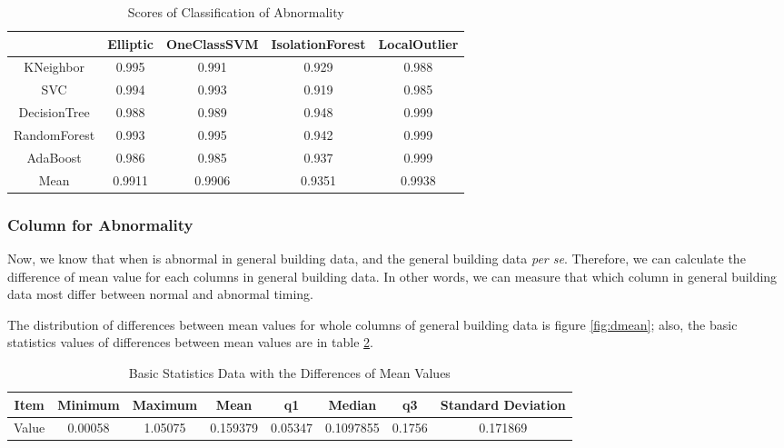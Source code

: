 \documentclass[aps, 10pt, a4paper]{article}
\begin{document}
                \begin{table}[htbp]
                    \centering
                    \caption{Scores of Classification of Abnormality}
                    \label{tb:abnormal}
                    \begin{tabular}{c|cccc}
                        & Elliptic & OneClassSVM & IsolationForest & LocalOutlier \\ \hline
                        KNeighbor & 0.995 & 0.991 & 0.929 & 0.988 \\
                        SVC & 0.994 & 0.993 & 0.919 & 0.985 \\
                        DecisionTree & 0.988 & 0.989 & 0.948 & 0.999 \\
                        RandomForest & 0.993 & 0.995 & 0.942 & 0.999 \\
                        AdaBoost & 0.986 & 0.985 & 0.937 & 0.999 \\ \hline
                        Mean & 0.9911 & 0.9906 & 0.9351 & 0.9938 \\
                    \end{tabular}
                \end{table}
            
            \subsubsection{Column for Abnormality}
                Now, we know that when is abnormal in general building data, and the general building data \textit{per se}. Therefore, we can calculate the difference of mean value for each columns in general building data. In other words, we can measure that which column in general building data most differ between normal and abnormal timing.
                
                The distribution of differences between mean values for whole columns of general building data is figure \ref{fig:dmean}; also, the basic statistics values of differences between mean values are in table \ref{tb:dmean}.
                
                \begin{table}[htbp]
                    \centering
                    \caption{Basic Statistics Data with the Differences of Mean Values}
                    \label{tb:dmean}
                    \begin{tabular}{c||c|c|c|c|c|c|c}
                        Item & Minimum & Maximum & Mean & q1 & Median & q3 & Standard Deviation \\ \hline
                        Value & 0.00058 & 1.05075 & 0.159379 & 0.05347 & 0.1097855 & 0.1756 & 0.171869 \\
                    \end{tabular}
                \end{table}
            
\end{document}
